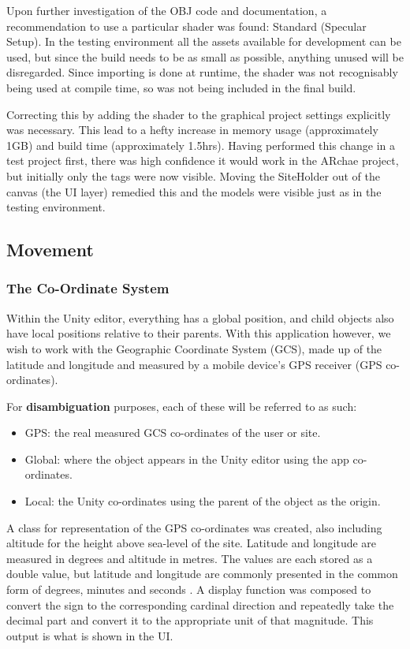 \documentclass[12pt, a4paper]{article}
\begin{document}
Upon further investigation of the OBJ code and documentation, a recommendation to use a particular shader was found: Standard (Specular Setup). In the testing environment all the assets available for development can be used, but since the build needs to be as small as possible, anything unused will be disregarded. Since importing is done at runtime, the shader was not recognisably being used at compile time, so was not being included in the final build. 

Correcting this by adding the shader to the graphical project settings explicitly was necessary. This lead to a hefty increase in memory usage (approximately 1GB) and build time (approximately 1.5hrs). Having performed this change in a test project first, there was high confidence it would work in the ARchae project, but initially only the tags were now visible. Moving the SiteHolder out of the canvas (the UI layer) remedied this and the models were visible just as in the testing environment.

\subsection{Movement}
\label{movement}

\subsubsection{The Co-Ordinate System}
Within the Unity editor, everything has a global position, and child objects also have local positions relative to their parents. With this application however, we wish to work with the Geographic Coordinate System (GCS), made up of the latitude and longitude and measured by a mobile device's GPS receiver (GPS co-ordinates). 

For \textbf{disambiguation} purposes, each of these will be referred to as such:
\begin{itemize}
    \item GPS: the real measured GCS co-ordinates of the user or site.
    \item Global: where the object appears in the Unity editor using the app co-ordinates.
    \item Local: the Unity co-ordinates using the parent of the object as the origin.
\end{itemize}

A class for representation of the GPS co-ordinates was created, also including altitude for the height above sea-level of the site. Latitude and longitude are measured in degrees and altitude in metres. The values are each stored as a double value, but latitude and longitude are commonly presented in the common form of degrees, minutes and seconds \cite{movement:latitudelongitude}. A display function was composed to convert the sign to the corresponding cardinal direction and repeatedly take the decimal part and convert it to the appropriate unit of that magnitude. This output is what is shown in the UI.
\end{document}
